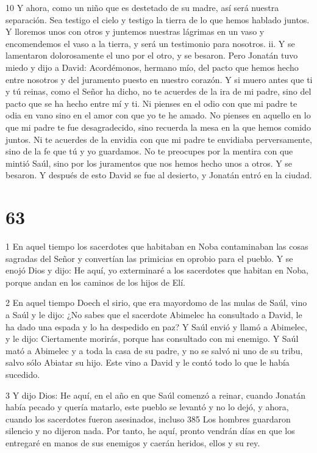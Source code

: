 \par 10 Y ahora, como un niño que es destetado de su madre, así será nuestra separación. Sea testigo el cielo y testigo la tierra de lo que hemos hablado juntos. Y lloremos unos con otros y juntemos nuestras lágrimas en un vaso y encomendemos el vaso a la tierra, y será un testimonio para nosotros. ii. Y se lamentaron dolorosamente el uno por el otro, y se besaron. Pero Jonatán tuvo miedo y dijo a David: Acordémonos, hermano mío, del pacto que hemos hecho entre nosotros y del juramento puesto en nuestro corazón. Y si muero antes que ti y tú reinas, como el Señor ha dicho, no te acuerdes de la ira de mi padre, sino del pacto que se ha hecho entre mí y ti. Ni pienses en el odio con que mi padre te odia en vano sino en el amor con que yo te he amado. No pienses en aquello en lo que mi padre te fue desagradecido, sino recuerda la mesa en la que hemos comido juntos. Ni te acuerdes de la envidia con que mi padre te envidiaba perversamente, sino de la fe que tú y yo guardamos. No te preocupes por la mentira con que mintió Saúl, sino por los juramentos que nos hemos hecho unos a otros. Y se besaron. Y después de esto David se fue al desierto, y Jonatán entró en la ciudad.

\chapter{63}

\par 1 En aquel tiempo los sacerdotes que habitaban en Noba contaminaban las cosas sagradas del Señor y convertían las primicias en oprobio para el pueblo. Y se enojó Dios y dijo: He aquí, yo exterminaré a los sacerdotes que habitan en Noba, porque andan en los caminos de los hijos de Elí.

\par 2 En aquel tiempo Doech el sirio, que era mayordomo de las mulas de Saúl, vino a Saúl y le dijo: ¿No sabes que el sacerdote Abimelec ha consultado a David, le ha dado una espada y lo ha despedido en paz? Y Saúl envió y llamó a Abimelec, y le dijo: Ciertamente morirás, porque has consultado con mi enemigo. Y Saúl mató a Abimelec y a toda la casa de su padre, y no se salvó ni uno de su tribu, salvo sólo Abiatar su hijo. Este vino a David y le contó todo lo que le había sucedido.

\par 3 Y dijo Dios: He aquí, en el año en que Saúl comenzó a reinar, cuando Jonatán había pecado y quería matarlo, este pueblo se levantó y no lo dejó, y ahora, cuando los sacerdotes fueron asesinados, incluso 385 Los hombres guardaron silencio y no dijeron nada. Por tanto, he aquí, pronto vendrán días en que los entregaré en manos de sus enemigos y caerán heridos, ellos y su rey.

